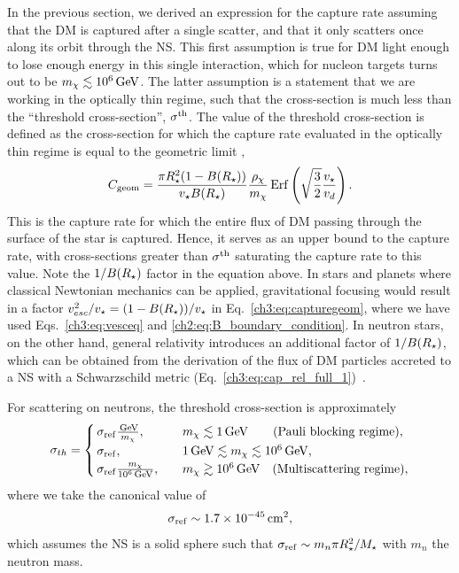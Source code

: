 In the previous section, we derived an expression for the capture rate assuming that the DM is captured after a single scatter, and that it only scatters once along its orbit through the NS. This first assumption is true for DM light enough to lose enough energy in this single interaction, which for nucleon targets turns out to be $m_\chi\lesssim 10^6{\rm \,GeV}$. The latter assumption is a statement that we are working in the optically thin regime, such that the cross-section is much less than the ``threshold cross-section'', $\sigma^{\rm th}$. The value of the threshold cross-section is defined as the cross-section for which the capture rate evaluated in the optically thin regime is equal to the geometric limit \cite{Bell:2018pkk_sep_HeatingNeutronStars},  
%
\begin{equation}
C_\mathrm{geom} =  \frac{\pi R_\star^2(1-B(R_\star))}{v_\star B(R_\star)} \frac{\rho_\chi}{m_\chi} {\rm \,Erf}\left(\sqrt{\frac{3}{2}}\frac{v_\star}{v_d}\right).
\label{ch3:eq:capturegeom}
\end{equation}
% 
This is the capture rate for which the entire flux of DM passing through the surface of the star is captured. Hence, it serves as an upper bound to the capture rate, with cross-sections greater than $\sigma^{\rm th}$ saturating the capture rate to this value.
Note the $1/B(R_\star)$ factor in the equation above. In stars and planets where classical Newtonian mechanics can be applied, gravitational focusing would result in a factor  $v_{esc}^2/v_\star =  (1-B(R_\star))/v_\star$ in Eq.~\ref{ch3:eq:capturegeom}, where we have used Eqs.~\ref{ch3:eq:vesceq} and \ref{ch2:eq:B_boundary_condition}. 
In neutron stars, on the other hand, general relativity introduces an additional factor of $1/B(R_\star)$, which can be obtained from the derivation of the flux of DM particles accreted to a NS with a Schwarzschild metric (Eq.~\ref{ch3:eq:cap_rel_full_1})~\cite{Goldman:1989nd_WeaklyInteractingMassive,Kouvaris:2007ay_WIMPAnnihilationCooling}.

For scattering on neutrons, the threshold cross-section is approximately
\begin{align}
\sigma_{th} =  \begin{cases}
\, \sigma_\mathrm{ref} \frac{{\rm \,GeV}}{m_\chi}, \quad &m_\chi \lesssim 1{\rm \,GeV} \quad \ \ \text{ (Pauli blocking  regime)}, \\
\, \sigma_\mathrm{ref}, \quad &1{\rm \,GeV} \lesssim m_\chi \lesssim 10^6{\rm \,GeV},  \\
\, \sigma_\mathrm{ref} \frac{m_\chi}{10^6{\rm \,GeV}}, \quad &m_\chi\gtrsim 10^6{\rm \,GeV} \quad  \text{(Multiscattering regime)},
\end{cases}
\label{ch3:eq:sigmath}
\end{align}
where we take the canonical value of
\begin{equation}
    \sigma_\mathrm{ref}\sim 1.7 \times 10^{-45}{\rm \,cm}^2,
\end{equation}
which assumes the NS is a solid sphere such that $\sigma_\mathrm{ref}\sim m_n \pi R_\star^2/M_\star$ with $m_n$ the neutron mass.

